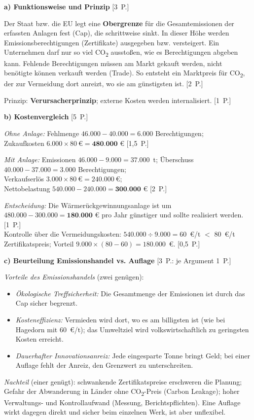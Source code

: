 \begin{loesung}[title={Lösung Aufgabe~3.8 --- Emissionshandel im Unternehmen}]
\textbf{a) Funktionsweise und Prinzip} \hfill [3~P.]

Der Staat bzw. die EU legt eine \textbf{Obergrenze} für die Gesamtemissionen der
erfassten Anlagen fest (Cap), die schrittweise sinkt. In dieser Höhe werden
Emissionsberechtigungen (Zertifikate) ausgegeben bzw. versteigert. Ein Unternehmen darf nur
so viel CO\textsubscript{2} ausstoßen, wie es Berechtigungen abgeben kann. Fehlende
Berechtigungen müssen am Markt gekauft werden, nicht benötigte können verkauft werden
(Trade). So entsteht ein Marktpreis für CO\textsubscript{2}, der zur Vermeidung dort
anreizt, wo sie am günstigsten ist. [2~P.]

Prinzip: \textbf{Verursacherprinzip}; externe Kosten werden internalisiert. [1~P.]

\medskip
\textbf{b) Kostenvergleich} \hfill [5~P.]

\emph{Ohne Anlage:} Fehlmenge $46.000 - 40.000 = 6.000$ Berechtigungen;\\
Zukaufkosten $6.000 \times 80~\text{€} = \textbf{480.000~€}$ [1,5~P.]

\emph{Mit Anlage:} Emissionen $46.000 - 9.000 = 37.000$~t; Überschuss
$40.000 - 37.000 = 3.000$ Berechtigungen;\\
Verkaufserlös $3.000 \times 80~\text{€} = 240.000~\text{€}$;\\
Nettobelastung $540.000 - 240.000 = \textbf{300.000~€}$ [2~P.]

\emph{Entscheidung:} Die Wärmerückgewinnungsanlage ist um $480.000 - 300.000 =
\textbf{180.000~€}$ pro Jahr günstiger und sollte realisiert werden. [1~P.]\\
Kontrolle über die Vermeidungskosten: $540.000 \div 9.000 = 60$~€/t $<$ 80~€/t
Zertifikatspreis; Vorteil $9.000 \times (80 - 60) = 180.000$~€. [0,5~P.]

\medskip
\textbf{c) Beurteilung Emissionshandel vs. Auflage} \hfill [3~P.: je Argument 1~P.]

\emph{Vorteile des Emissionshandels} (zwei genügen):
\begin{itemize}
  \item \emph{Ökologische Treffsicherheit:} Die Gesamtmenge der Emissionen ist durch das
    Cap sicher begrenzt.
  \item \emph{Kosteneffizienz:} Vermieden wird dort, wo es am billigsten ist (wie bei
    Hagedorn mit 60~€/t); das Umweltziel wird volkswirtschaftlich zu geringsten Kosten
    erreicht.
  \item \emph{Dauerhafter Innovationsanreiz:} Jede eingesparte Tonne bringt Geld; bei
    einer Auflage fehlt der Anreiz, den Grenzwert zu unterschreiten.
\end{itemize}
\emph{Nachteil} (einer genügt): schwankende Zertifikatspreise erschweren die Planung;
Gefahr der Abwanderung in Länder ohne CO\textsubscript{2}-Preis (Carbon Leakage);
hoher Verwaltungs- und Kontrollaufwand (Messung, Berichtspflichten). Eine Auflage wirkt
dagegen direkt und sicher beim einzelnen Werk, ist aber unflexibel.
\end{loesung}
